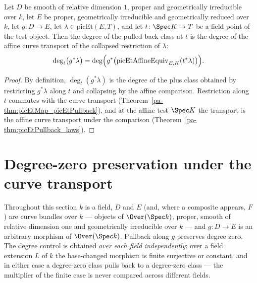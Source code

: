 \begin{theorem}
  \label{pa-thm:degAt_picEtPullback}
  \leanok

  Let \(D\) be smooth of relative dimension \(1\), proper and geometrically irreducible
  over \(k\), let \(E\) be proper, geometrically irreducible and geometrically reduced
  over \(k\), let \(g \colon D \to E\), let \(\lambda \in \mathrm{picEt}(E, T)\), and
  let \(t \colon \Spec K \to T\) be a field point of the test object. Then the degree
  of the pulled-back class at \(t\) is the degree of the affine curve transport of the
  collapsed restriction of \(\lambda\):
  \[
    \deg_{t}\bigl(g^{*}\lambda\bigr)
      = \deg\Bigl( g^{*}\bigl(\mathrm{picEtAffineEquiv}_{E,K}(t^{*}\lambda)\bigr) \Bigr).
  \]
\end{theorem}
\begin{proof}
  \leanok
  By definition, \(\deg_t(g^{*}\lambda)\) is the degree of the plus class obtained by
  restricting \(g^{*}\lambda\) along \(t\) and collapsing by the affine comparison.
  Restriction along \(t\) commutes with the curve transport
  (Theorem~\ref{pa-thm:picEtMap_picEtPullback}), and at the affine test \(\Spec K\) the
  transport is the affine curve transport under the comparison
  (Theorem~\ref{pa-thm:picEtPullback_laws}).
\end{proof}

\section{Degree-zero preservation under the curve transport}

Throughout this section \(k\) is a field, \(D\) and \(E\) (and, where a composite
appears, \(F\)) are curve bundles over \(k\) — objects of \(\Over(\Spec k)\), proper,
smooth of relative dimension one and geometrically irreducible over \(k\) — and
\(g \colon D \to E\) is an arbitrary morphism of \(\Over(\Spec k)\). Pullback along
\(g\) preserves degree zero. The degree control is obtained \emph{over each field
independently}: over a field extension \(L\) of \(k\) the base-changed morphism is
finite surjective or constant, and in either case a degree-zero class pulls back to a
degree-zero class — the multiplier of the finite case is never compared across
different fields.

